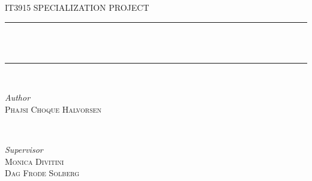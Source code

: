 
\begin{titlepage} %
	\newcommand{\HRule}{\rule{\linewidth}{0.5mm}} %
	
	\center %
	
	
	\textsc{\LARGE IT3915 SPECIALIZATION PROJECT}\\[1.5cm] %
	
	

	
	
	\HRule\\[0.4cm]
	
    \doublespacing	
	{\huge\bfseries{}}\\[0.6cm] %
	\onehalfspacing

	\HRule\\[1.5cm]
	

	
	\begin{minipage}{0.4\textwidth}
		\begin{flushleft}
			\large
			\textit{Author}\\
			\textsc{Phajsi Choque Halvorsen\\} %
		\end{flushleft}
	\end{minipage}
	~
	\begin{minipage}{0.4\textwidth}
		\begin{flushright}
			\large
			\textit{Supervisor}\\
			\textsc{Monica Divitini\\}
			\textsc{Dag Frode Solberg\\}
		\end{flushright}
	\end{minipage}
	

\end{titlepage}
